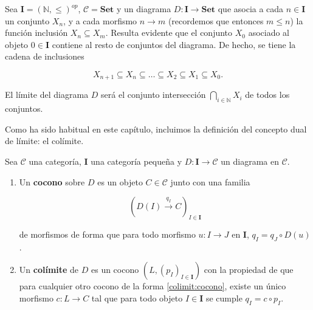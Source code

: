 \begin{ejemplo}
    Sea $\textbf{I} = (\mathbb{N}, \leq)^{op}$, $\mathscr{C} = \textbf{Set}$ y un diagrama $D: \textbf{I} \longrightarrow \textbf{Set}$ que asocia a cada $n \in \textbf{I}$ un conjunto $X_n$, y a cada morfismo  $n \longrightarrow m$ (recordemos que entonces $m \leq n$) la función inclusión $X_n \subseteq X_m$. Resulta evidente que el conjunto $X_0$ asociado al objeto $0 \in \textbf{I}$ contiene al resto de conjuntos del diagrama. De hecho, se tiene la cadena de inclusiones

    \begin{equation}
        X_{n+1} \subseteq X_n \subseteq \dots \subseteq X_2 \subseteq X_1 \subseteq X_0 \text{.}
    \end{equation}

    El límite del diagrama $D$ será el conjunto intersección $\bigcap_{i \in \mathbb{N}} X_i $ de todos los conjuntos.

\end{ejemplo}

Como ha sido habitual en este capítulo, incluimos la definición del concepto dual de límite: el colímite.

\begin{definicion} 
    Sea $\mathscr{C}$ una categoría, \textbf{I} una categoría pequeña y $D: \textbf{I} \longrightarrow \mathscr{C}$ un diagrama en $\mathscr{C}$.
    \begin{enumerate}
        \item Un \textbf{cocono} sobre $D$ es un objeto $C \in \mathscr{C}$ junto con una familia
        
        \begin{equation} \label{colimit:cocono}
            \left( D(I) \overset{q_I}{\longrightarrow} C\right)_{I \in \textbf{I}}
        \end{equation}

        de morfismos de forma que para todo morfismo $u: I \longrightarrow J$ en \textbf{I}, $q_I = q_J \circ D(u)$.

        \item Un \textbf{colímite} de $D$ es un cocono $\left(L, (p_I)_{I \in \textbf{I}}\right)$ con la propiedad de que para cualquier otro cocono de la forma \eqref{colimit:cocono}, existe un único morfismo $c: L \longrightarrow C$ tal que para todo objeto $I \in \textbf{I}$ se cumple $q_I = c \circ p_I$.
    \end{enumerate}
\end{definicion}  

